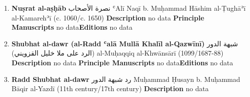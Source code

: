 \documentclass{article}
\begin{document}
\begin{enumerate}
      \item \textbf{Nuṣrat al-aṣḥāb}
        \newline
        \textarabic{نصرة الأصحاب}
        \newline
        ʿAlī Naqī b. Muḥammad Hāshim al-Ṭughāʾī al-Kamarehʾī
        \newline
        (c. 1060/c. 1650)
        \newline
        \newline
        \textbf{Description}
        \newline	
        no data
        \newline
        \newline
    \textbf{Principle Manuscripts}
\newline
no data\newline\textbf{Editions}
\newline
no data\newline
      \item \textbf{Shubhat al-dawr (al-Radd ʿalā Mullā Khalīl al-Qazwīnī)}
        \newline
        \textarabic{شبهة الدور (الرد على ملا خليل القزويني)}
        \newline
        al-Muḥaqqiq al-Khwānsārī
        \newline
        (1099/1687-88)
        \newline
        \newline
        \textbf{Description}
        \newline	
        no data
        \newline
        \newline
    \textbf{Principle Manuscripts}
\newline
no data\newline\textbf{Editions}
\newline
no data\newline
      \item \textbf{Radd Shubhat al-dawr}
        \newline
        \textarabic{رد شبهة الدور}
        \newline
        Muḥammad Ḥusayn b. Muḥammad Bāqir al-Yazdī
        \newline
        (11th century/17th century)
        \newline
        \newline
        \textbf{Description}
        \newline	
        no data

\end{enumerate}
\end{document}
